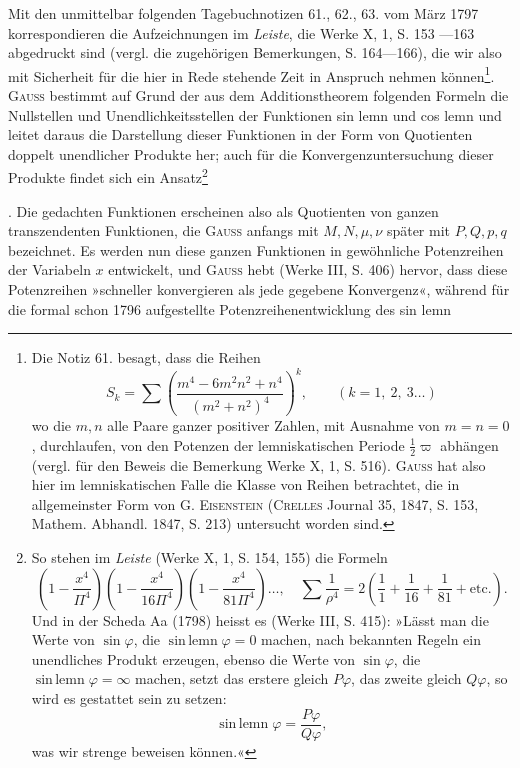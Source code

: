 Mit den unmittelbar folgenden Tagebuchnotizen 61., 62., 63. vom März
1797 korrespondieren die Aufzeichnungen im \textit{Leiste}, die Werke X, 1, S. 153
—163 abgedruckt sind (vergl. die zugehörigen Bemerkungen, S. 164—166),
die wir also mit Sicherheit für die hier in Rede stehende Zeit in Anspruch
nehmen können\footnote{Die Notiz 61. besagt, dass die Reihen
\[
S_k=\sum\left(\frac{m^4-6m^2n^2+n^4}{(m^2+n^2)^4}\right)^k,\qquad(k=1,\ 2,\ 3\ldots)
\]
wo die \(m,n\) alle Paare ganzer positiver Zahlen, mit Ausnahme von \(m=n=0\), durchlaufen, von den
Potenzen der lemniskatischen Periode \(\frac12\varpi\) abhängen (vergl. für den Beweis die Bemerkung Werke X, 1,
S. 516). \textsc{Gauss} hat also hier im lemniskatischen Falle die Klasse von Reihen betrachtet, die in allgemeinster
Form von G. \textsc{Eisenstein} (\textsc{Crelles} Journal 35, 1847, S. 153, Mathem. Abhandl. 1847, S. 213)
untersucht worden sind.}. \textsc{Gauss} bestimmt auf Grund der aus dem Additionstheorem
folgenden Formeln die Nullstellen und Unendlichkeitsstellen der Funktionen
sin lemn und cos lemn und leitet daraus die Darstellung dieser Funktionen
in der Form von Quotienten doppelt unendlicher Produkte her; auch für die
Konvergenzuntersuchung dieser Produkte findet sich ein Ansatz\begingroup\renewcommand{\thefootnote}{50a)}\footnote{So stehen im \textit{Leiste} (Werke X, 1, S. 154, 155) die Formeln
\[
\left(1-\frac{x^4}{\Pi^4}\right)\left(1-\frac{x^4}{16\Pi^4}\right)\left(1-\frac{x^4}{81\Pi^4}\right)\ldots,\quad
\sum\frac1{\rho^4}=2\left(\frac11+\frac1{16}+\frac1{81}+\text{etc.}\right).
\]
Und in der Scheda Aa (1798) heisst es (Werke III, S. 415): »Lässt man die Werte von \(\sin\varphi\), die \(\operatorname{sin\,lemn}\varphi
=0\) machen, nach bekannten Regeln ein unendliches Produkt erzeugen, ebenso die Werte von \(\sin\varphi\), die
\(\operatorname{sin\,lemn}\varphi=\infty\) machen, setzt das erstere gleich \(P\varphi\), das zweite gleich \(Q\varphi\), so wird es gestattet sein zu
setzen:
\[
\operatorname{sin\,lemn}\varphi=\frac{P\varphi}{Q\varphi},
\]
was wir strenge beweisen können.«}\endgroup\addtocounter{footnote}{-1}.
Die gedachten Funktionen erscheinen also als Quotienten von ganzen transzendenten
Funktionen, die \textsc{Gauss} anfangs mit \(M,N,\mu,\nu\) später mit \(P,Q,p,q\) bezeichnet.
Es werden nun diese ganzen Funktionen in gewöhnliche Potenzreihen der
Variabeln \(x\) entwickelt, und \textsc{Gauss} hebt (Werke III, S. 406) hervor, dass diese
Potenzreihen »schneller konvergieren als jede gegebene Konvergenz«, während
für die formal schon 1796 aufgestellte Potenzreihenentwicklung des sin lemn
